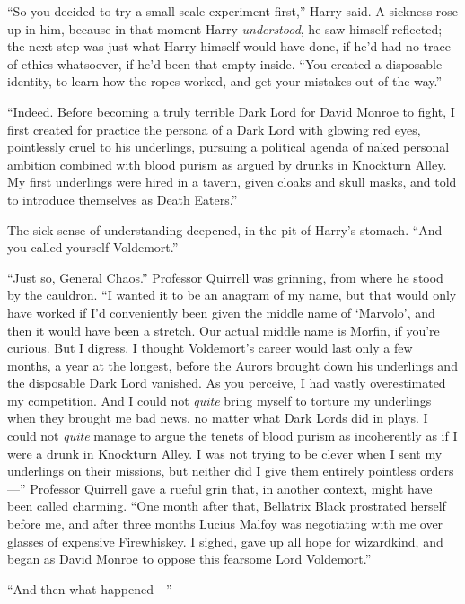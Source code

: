 “So you decided to try a small-scale experiment first,” Harry said. A sickness rose up in him, because in that moment Harry \emph{understood}, he saw himself reflected; the next step was just what Harry himself would have done, if he’d had no trace of ethics whatsoever, if he’d been that empty inside. “You created a disposable identity, to learn how the ropes worked, and get your mistakes out of the way.”

“Indeed. Before becoming a truly terrible Dark Lord for David Monroe to fight, I first created for practice the persona of a Dark Lord with glowing red eyes, pointlessly cruel to his underlings, pursuing a political agenda of naked personal ambition combined with blood purism as argued by drunks in Knockturn Alley. My first underlings were hired in a tavern, given cloaks and skull masks, and told to introduce themselves as Death Eaters.”

The sick sense of understanding deepened, in the pit of Harry’s stomach. “And you called yourself Voldemort.”

“Just so, General Chaos.” Professor Quirrell was grinning, from where he stood by the cauldron. “I wanted it to be an anagram of my name, but that would only have worked if I’d conveniently been given the middle name of ‘Marvolo’, and then it would have been a stretch. Our actual middle name is Morfin, if you’re curious. But I digress. I thought Voldemort’s career would last only a few months, a year at the longest, before the Aurors brought down his underlings and the disposable Dark Lord vanished. As you perceive, I had vastly overestimated my competition. And I could not \emph{quite} bring myself to torture my underlings when they brought me bad news, no matter what Dark Lords did in plays. I could not \emph{quite} manage to argue the tenets of blood purism as incoherently as if I were a drunk in Knockturn Alley. I was not trying to be clever when I sent my underlings on their missions, but neither did I give them entirely pointless orders—” Professor Quirrell gave a rueful grin that, in another context, might have been called charming. “One month after that, Bellatrix Black prostrated herself before me, and after three months Lucius Malfoy was negotiating with me over glasses of expensive Firewhiskey. I sighed, gave up all hope for wizardkind, and began as David Monroe to oppose this fearsome Lord Voldemort.”

“And then what happened—”

